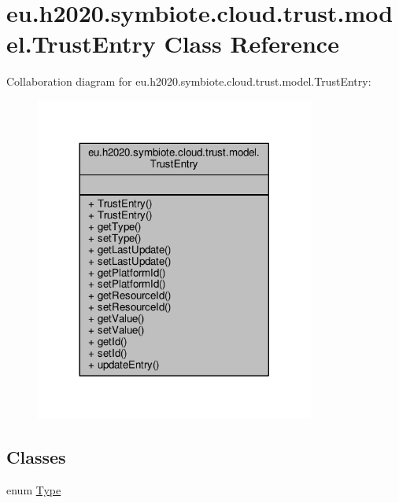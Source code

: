\hypertarget{classeu_1_1h2020_1_1symbiote_1_1cloud_1_1trust_1_1model_1_1TrustEntry}{}\section{eu.\+h2020.\+symbiote.\+cloud.\+trust.\+model.\+Trust\+Entry Class Reference}
\label{classeu_1_1h2020_1_1symbiote_1_1cloud_1_1trust_1_1model_1_1TrustEntry}


Collaboration diagram for eu.\+h2020.\+symbiote.\+cloud.\+trust.\+model.\+Trust\+Entry\+:
\nopagebreak
\begin{figure}[H]
\begin{center}
\leavevmode
\includegraphics[width=260pt]{classeu_1_1h2020_1_1symbiote_1_1cloud_1_1trust_1_1model_1_1TrustEntry__coll__graph}
\end{center}
\end{figure}
\subsection*{Classes}
\begin{DoxyCompactItemize}
\item 
enum \hyperlink{enumeu_1_1h2020_1_1symbiote_1_1cloud_1_1trust_1_1model_1_1TrustEntry_1_1Type}{Type}
\end{DoxyCompactItemize}
